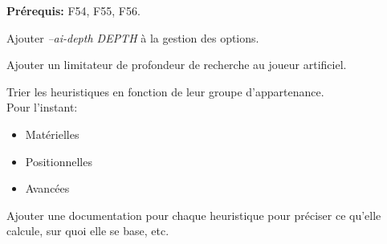 \documentclass{article}
\begin{document}
\begin{needbox}
    \textbf{Prérequis:} F54, F55, F56.
    \begin{subneedbox}
        Ajouter \textit{--ai-depth DEPTH} à la gestion des options.
    \end{subneedbox}
    \begin{subneedbox}
        Ajouter un limitateur de profondeur de recherche au joueur artificiel.
    \end{subneedbox}
\end{needbox}

\begin{needbox}
    \begin{subneedbox}
        Trier les heuristiques en fonction de leur groupe d'appartenance.\\
        Pour l'instant:
        \begin{itemize}
            \item Matérielles
            \item Positionnelles
            \item Avancées
        \end{itemize}
    \end{subneedbox}
    \begin{subneedbox}
        Ajouter une documentation pour chaque heuristique pour préciser ce qu'elle calcule, sur quoi 
        elle se base, etc.
    \end{subneedbox}
\end{needbox}
\end{document}
